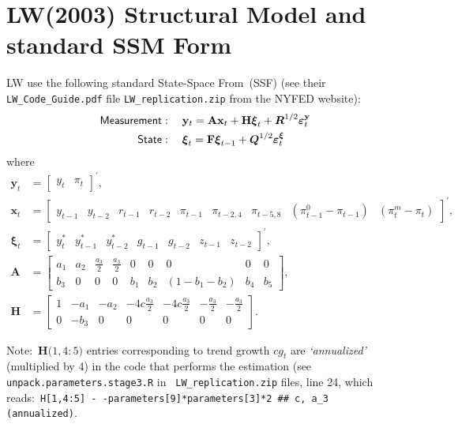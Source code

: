 \documentclass[a4paper,12pt]{article}
\begin{document}
\section{LW(2003) Structural Model and standard SSM Form}

LW use the following standard State-Space From\ (SSF) (see their \texttt{%
LW\_Code\_Guide.pdf} file \texttt{LW\_replication.zip} from the NYFED
website):%
\begin{align*}
\mathsf{Measurement}& :\quad \mathbf{y}_{t}=\mathbf{Ax}_{t}+\mathbf{H}%
\boldsymbol{\xi }_{t}+\boldsymbol{R}^{1/2}\boldsymbol{\varepsilon }_{t}^{%
\mathbf{y}} \\
\mathsf{State}& :\quad \boldsymbol{\xi }_{t}=\mathbf{F}\boldsymbol{\xi }%
_{t-1}+\boldsymbol{Q}^{1/2}\boldsymbol{\varepsilon }_{t}^{\boldsymbol{\xi }}
\end{align*}%
where%
\begin{align*}
\mathbf{y}_{t}& =%
\begin{bmatrix}
y_{t} & \pi _{t}%
\end{bmatrix}%
^{\prime }, \\
\mathbf{x}_{t}& =%
\begin{bmatrix}
y_{t-1} & y_{t-2} & r_{t-1} & r_{t-2} & \pi _{t-1} & \pi _{t-2,4} & \pi
_{t-5,8} & \left( \pi _{t-1}^{0}-\pi _{t-1}\right)  & \left( \pi
_{t}^{m}-\pi _{t}\right)
\end{bmatrix}%
^{\prime }, \\
\boldsymbol{\xi }_{t}& =%
\begin{bmatrix}
y_{t}^{\ast } & y_{t-1}^{\ast } & y_{t-2}^{\ast } & g_{t-1} & g_{t-2} &
z_{t-1} & z_{t-2}%
\end{bmatrix}%
^{\prime }, \\
\mathbf{A}& =%
\begin{bmatrix}
a_{1} & a_{2} & \frac{a_{3}}{2} & \frac{a_{3}}{2} & 0 & 0 & 0 & 0 & 0 \\
b_{3} & 0 & 0 & 0 & b_{1} & b_{2} & \left( 1-b_{1}-b_{2}\right)  & b_{4} &
b_{5}%
\end{bmatrix}%
, \\
\mathbf{H}& =%
\begin{bmatrix}
1 & -a_{1} & -a_{2} & -4c\frac{a_{3}}{2} & -4c\frac{a_{3}}{2} & -\frac{a_{3}%
}{2} & -\frac{a_{3}}{2} \\
0 & -b_{3} & 0 & 0 & 0 & 0 & 0%
\end{bmatrix}%
.
\end{align*}

\noindent Note:\ $\mathbf{H(}1,4:5\mathbf{)}$ entries corresponding to trend
growth $cg_{t}$ are \emph{`annualized'} (multiplied by 4) in the code that
performs the estimation (see \texttt{unpack.parameters.stage3.R} in \texttt{%
LW\_replication.zip} files, line 24, which reads:\ \texttt{H[1,4:5]
\TEXTsymbol{<}- -parameters[9]*parameters[3]*2 \#\# c, a\_3 (annualized)}.
\end{document}
